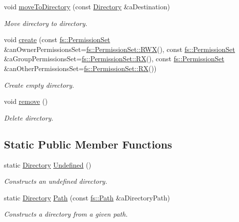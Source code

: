 \begin{DoxyCompactItemize}
void \hyperlink{classlibrary_1_1core_1_1fs_1_1Directory_a666a1ac6f84535bb113979115a760f11}{move\+To\+Directory} (const \hyperlink{classlibrary_1_1core_1_1fs_1_1Directory}{Directory} \&a\+Destination)
\begin{DoxyCompactList}\small\item\em Move directory to directory. \end{DoxyCompactList}\item 
void \hyperlink{classlibrary_1_1core_1_1fs_1_1Directory_a4ca33de67d870bfd0f20db68242dac9d}{create} (const \hyperlink{classlibrary_1_1core_1_1fs_1_1PermissionSet}{fs\+::\+Permission\+Set} \&an\+Owner\+Permissions\+Set=\hyperlink{classlibrary_1_1core_1_1fs_1_1PermissionSet_afa3f9d07a7053240ae97c587543cdb00}{fs\+::\+Permission\+Set\+::\+R\+WX}(), const \hyperlink{classlibrary_1_1core_1_1fs_1_1PermissionSet}{fs\+::\+Permission\+Set} \&a\+Group\+Permissions\+Set=\hyperlink{classlibrary_1_1core_1_1fs_1_1PermissionSet_ab632d79f1b8b8f4577bc06fa622b1c09}{fs\+::\+Permission\+Set\+::\+RX}(), const \hyperlink{classlibrary_1_1core_1_1fs_1_1PermissionSet}{fs\+::\+Permission\+Set} \&an\+Other\+Permissions\+Set=\hyperlink{classlibrary_1_1core_1_1fs_1_1PermissionSet_ab632d79f1b8b8f4577bc06fa622b1c09}{fs\+::\+Permission\+Set\+::\+RX}())
\begin{DoxyCompactList}\small\item\em Create empty directory. \end{DoxyCompactList}\item 
void \hyperlink{classlibrary_1_1core_1_1fs_1_1Directory_a8392a637e3b8cc07f55c0bc2850fb42b}{remove} ()
\begin{DoxyCompactList}\small\item\em Delete directory. \end{DoxyCompactList}\end{DoxyCompactItemize}
\subsection*{Static Public Member Functions}
\begin{DoxyCompactItemize}
\item 
static \hyperlink{classlibrary_1_1core_1_1fs_1_1Directory}{Directory} \hyperlink{classlibrary_1_1core_1_1fs_1_1Directory_ae26fce16c37e5fed2bcc4d914a5eaa71}{Undefined} ()
\begin{DoxyCompactList}\small\item\em Constructs an undefined directory. \end{DoxyCompactList}\item 
static \hyperlink{classlibrary_1_1core_1_1fs_1_1Directory}{Directory} \hyperlink{classlibrary_1_1core_1_1fs_1_1Directory_a6d3ea04654841e62a4dbd99feb563caf}{Path} (const \hyperlink{classlibrary_1_1core_1_1fs_1_1Path}{fs\+::\+Path} \&a\+Directory\+Path)
\begin{DoxyCompactList}\small\item\em Constructs a directory from a given path. \end{DoxyCompactList}\end{DoxyCompactItemize}
